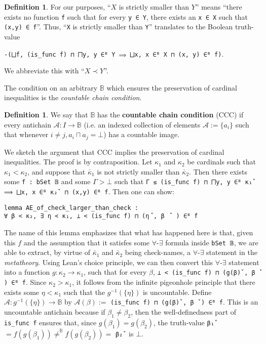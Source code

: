 \documentclass[a4paper,USenglish,cleveref, autoref]{lipics-v2019}
\newcommand{\B}{\mathbb{B}}
\newcommand{\lil}{\lstinline}
\theoremstyle{theorem}
\theoremstyle{definition}
\newtheorem{defn}[definition]{Definition}
\begin{document}
\begin{defn}
  For our purposes, ``$X$ is strictly smaller than $Y$'' means ``there exists no function \lil{f} such that for every \lil{y ∈ Y}, there exists an \lil{x ∈ X} such that \lil{(x,y) ∈ f}''. Thus, ``\lil{X} is strictly smaller than \lil{Y}'' translates to the Boolean truth-value
\begin{center}\lstinline{-(⨆f, (is_func f) ⊓ ⨅y, y ∈ᴮ Y ⟹ ⨆x, x ∈ᴮ X ⊓ (x, y) ∈ᴮ f)}.\end{center} We abbreviate this with ``$X \prec Y$''.
\end{defn}

The condition on an arbitrary $\B$ which ensures the preservation of cardinal inequalities is the \emph{countable chain condition}.

\begin{defn}
We say that $\B$ has the \textbf{countable chain condition} (CCC) if every antichain $\mathcal{A} : I \to \B$ (i.e. an indexed collection of elements $\mathcal{A} := \{a_i\}$ such that whenever $i \neq j, a_i \sqcap a_j = \bot$) has a countable image.
\end{defn}

We sketch the argument that CCC implies the preservation of cardinal inequalities. The proof is by contraposition. Let $\kappa_1$ and $\kappa_2$ be cardinals such that $\kappa_1 < \kappa_2$, and suppose that $\check{\kappa_1}$ is not strictly smaller than $\check{\kappa_2}$. Then there exists some \lil{f : bSet 𝔹} and some $\Gamma > \bot$ such that \lstinline{Γ ≤ (is_func f) ⊓ ⨅y, y ∈ᴮ κ₁̌  ⟹ ⨆x, x ∈ᴮ κ₂̌  ⊓ (x,y) ∈ᴮ f}. Then one can show:
\begin{lstlisting}
lemma AE_of_check_larger_than_check :
∀ β < κ₂, ∃ η < κ₁, ⊥ < (is_func f) ⊓ (η⠀̌, β ⠀̌ ) ∈ᴮ f
\end{lstlisting}
The name of this lemma emphasizes that what has happened here is that, given this $f$ and the assumption that it satisfes some $\forall$-$\exists$ formula inside \lil{bSet 𝔹}, we are able to extract, by virtue of $\check{\kappa_1}$ and $\check{\kappa_2}$ being check-names, a $\forall$-$\exists$ statement in the \emph{metatheory}. Using Lean's choice principle, we can then convert this $\forall$-$\exists$ statement into a function $g : \kappa_2 \to \kappa_1$, such that for every $\beta$, \lstinline{⊥ < (is_func f) ⊓ (g(β)̌ , β ̌ ) ∈ᴮ f}. Since $\kappa_2 > \kappa_1$, it follows from the infinite pigeonhole principle that there exists some $\eta < \kappa_1$ such that the $g^{-1}(\{\eta\})$ is uncountable. Define $\mathcal{A} : g^{-1}(\{\eta\}) \to \B$ by $\mathcal{A}(\beta) :=$ \lil{(is_func f) ⊓ (g(β)̌ , β ̌ ) ∈ᴮ f}. This is an uncountable antichain because if $\beta_1 \neq \beta_2$, then the well-definedness part of \lil{is_func f} ensures that, since $g(\beta_1) = g(\beta_2)$, the truth-value \lil{β₁̌ } $= f(g(\beta_1)) \neq^\B f(g(\beta_2)) =$ \lil{β₂̌ } is $\bot$.
\end{document}
